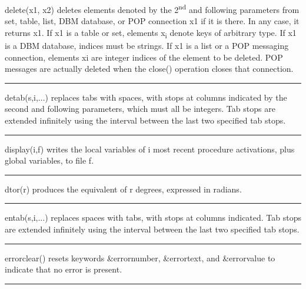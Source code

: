 \noindent
{}delete(x1, x2) deletes elements denoted by the
2\textsuperscript{nd} and following parameters from set, table, list,
DBM database, or POP connection x1 if it is there. In any case, it
returns x1. If x1 is a table or set, elements x\textsubscript{i} denote
keys of arbitrary type. If x1 is a DBM database, indices must be
strings. If x1 is a list or a POP messaging connection, elements xi are
integer indices of the element to be deleted. POP messages are actually
deleted when the close() operation closes that connection.

\bigskip\hrule\vspace{0.1cm}

\noindent
detab(s,i,...) replaces tabs with spaces, with stops at columns
indicated by the second and following parameters, which must all be
integers. Tab stops are extended infinitely using the interval between
the last two specified tab stops.

\bigskip\hrule\vspace{0.1cm}

\noindent
{}display(i,f) writes the local variables of i most
recent procedure activations, plus global variables, to file f.

\bigskip\hrule\vspace{0.1cm}

\noindent
{}dtor(r) produces the
equivalent of r degrees, expressed in radians.

\bigskip\hrule\vspace{0.1cm}

\noindent
entab(s,i,...) replaces spaces with tabs, with stops at columns
indicated. Tab stops are extended infinitely using the interval between
the last two specified tab stops.

\bigskip\hrule\vspace{0.1cm}

\noindent
{}errorclear() resets keywords \&errornumber,
\&errortext, and \&errorvalue to indicate that no error is present.

\bigskip\hrule\vspace{0.1cm}

